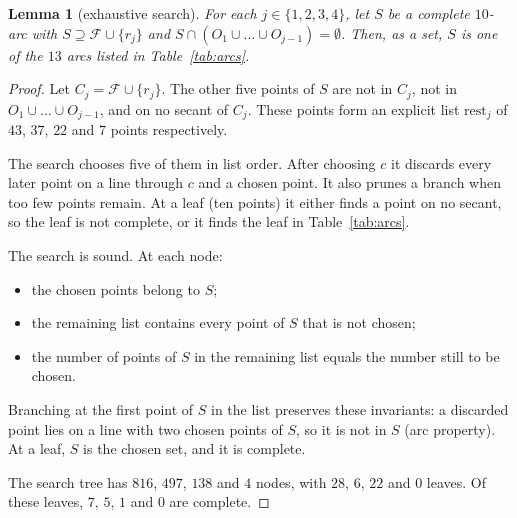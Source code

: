 \documentclass[11pt]{article}
\newtheorem{lemma}[theorem]{Lemma}
\theoremstyle{definition}
\theoremstyle{remark}
\begin{document}
\begin{lemma}[exhaustive search]\label{lem:search}
For each $j\in\{1,2,3,4\}$, let $S$ be a complete $10$-arc with
$S\supseteq\mathcal F\cup\{r_j\}$ and $S\cap(O_1\cup\dots\cup O_{j-1})=
\emptyset$. Then, as a set, $S$ is one of the $13$ arcs listed in
Table~\ref{tab:arcs}.
\end{lemma}
\begin{proof}
Let $C_j=\mathcal F\cup\{r_j\}$. The other five points of $S$ are not in $C_j$,
not in $O_1\cup\dots\cup O_{j-1}$, and on no secant of $C_j$. These points form
an explicit list $\mathrm{rest}_j$ of $43$, $37$, $22$ and $7$ points
respectively.

The search chooses five of them in list order. After choosing $c$ it discards
every later point on a line through $c$ and a chosen point. It also prunes a
branch when too few points remain. At a leaf (ten points) it either finds a
point on no secant, so the leaf is not complete, or it finds the leaf in
Table~\ref{tab:arcs}.

The search is sound. At each node:
\begin{itemize}
\item the chosen points belong to $S$;
\item the remaining list contains every point of $S$ that is not chosen;
\item the number of points of $S$ in the remaining list equals the number still
to be chosen.
\end{itemize}
Branching at the first point of $S$ in the list preserves these invariants: a
discarded point lies on a line with two chosen points of $S$, so it is not in
$S$ (arc property). At a leaf, $S$ is the chosen set, and it is complete.

The search tree has $816$, $497$, $138$ and $4$ nodes, with $28$, $6$, $22$ and
$0$ leaves. Of these leaves, $7$, $5$, $1$ and $0$ are complete.
\end{proof}
\end{document}
